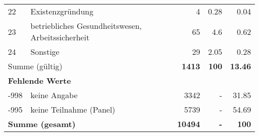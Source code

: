 \begin{longtable}{lXrrr}
        22 & \multicolumn{1}{X}{Existenzgründung} & %
          \num{4} &
          \num[round-mode=places,round-precision=2]{0,28} &
          \num[round-mode=places,round-precision=2]{0,04} \\

        23 & \multicolumn{1}{X}{betriebliches Gesundheitswesen, Arbeitssicherheit} & %
          \num{65} &
          \num[round-mode=places,round-precision=2]{4,6} &
          \num[round-mode=places,round-precision=2]{0,62} \\

        24 & \multicolumn{1}{X}{Sonstige} & %
          \num{29} &
          \num[round-mode=places,round-precision=2]{2,05} &
          \num[round-mode=places,round-precision=2]{0,28} \\

     \midrule
     \multicolumn{2}{l}{Summe (gültig)} &
       \textbf{\num{1413}} &
     \textbf{100} &
       \textbf{\num[round-mode=places,round-precision=2]{13,46}} \\
     \multicolumn{5}{l}{\textbf{Fehlende Werte}}\\
       -998 &
       keine Angabe &
         \num{3342} &
        - &
         \num[round-mode=places,round-precision=2]{31,85} \\
       -995 &
       keine Teilnahme (Panel) &
         \num{5739} &
        - &
         \num[round-mode=places,round-precision=2]{54,69} \\
     \midrule
     \multicolumn{2}{l}{\textbf{Summe (gesamt)}} &
          \textbf{\num{10494}} &
        \textbf{-} &
        \textbf{100} \\
     \bottomrule
     \end{longtable}
     
